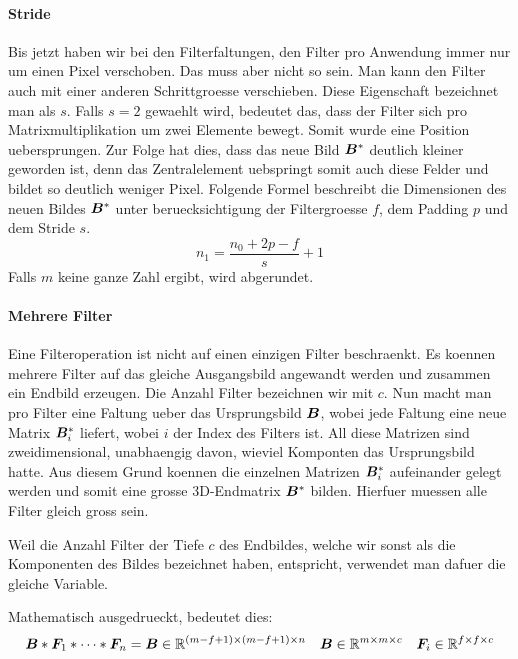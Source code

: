 \documentclass[../main]{subfiles}
\begin{document}
\paragraph{Stride}
Bis jetzt haben wir bei den Filterfaltungen, den Filter pro Anwendung immer nur
um einen Pixel verschoben. Das muss aber nicht so sein. Man kann den Filter
auch mit einer anderen Schrittgroesse verschieben. Diese Eigenschaft bezeichnet
man als  $s$. Falls $s = 2$ gewaehlt wird, bedeutet das, dass der
Filter sich pro Matrixmultiplikation um zwei Elemente bewegt. Somit wurde eine
Position uebersprungen. Zur Folge hat dies, dass das neue Bild $\bm{B}^*$
deutlich kleiner geworden ist, denn das Zentralelement uebspringt somit auch
diese Felder und bildet so deutlich weniger Pixel.
\para{}
Folgende Formel beschreibt die Dimensionen des neuen Bildes $\bm{B}^*$ unter
beruecksichtigung der Filtergroesse $f$, dem Padding $p$ und dem Stride $s$.
\begin{equation}
  n_1 = \frac{n_0 + 2p - f}{s} + 1
\end{equation}
Falls $m$ keine ganze Zahl ergibt, wird abgerundet.

\paragraph{Mehrere Filter}
Eine Filteroperation ist nicht auf einen einzigen Filter beschraenkt. Es koennen
mehrere Filter auf das gleiche Ausgangsbild angewandt werden und zusammen ein
Endbild erzeugen.
\para{}
Die Anzahl Filter bezeichnen wir mit $c$.
Nun macht man pro Filter eine Faltung ueber das Ursprungsbild $\bm{B}$, wobei
jede Faltung eine neue Matrix $\bm{B}^*_i$ liefert, wobei $i$ der Index des
Filters ist. All diese Matrizen sind zweidimensional, unabhaengig davon, wieviel
Komponten das Ursprungsbild hatte. Aus diesem Grund koennen die einzelnen
Matrizen $\bm{B}^*_i$ aufeinander gelegt werden und somit eine grosse 3D-Endmatrix
$\bm{B}^*$ bilden.
Hierfuer muessen alle Filter gleich gross sein.

Weil die Anzahl Filter der Tiefe $c$ des Endbildes, welche wir sonst als die
Komponenten des Bildes bezeichnet haben, entspricht, verwendet man dafuer die gleiche Variable.

Mathematisch ausgedrueckt, bedeutet dies:
\begin{equation}
  \bm{B} * \bm{F}_1 * \cdots * \bm{F}_n = \bm{B} \in \mathbb{R}^{(m-f+1) \times (m-f+1) \times n} \quad \bm{B} \in \mathbb{R}^{m \times m \times c} \quad \bm{F}_i \in \mathbb{R}^{f \times f \times c}
\end{equation}
\end{document}
